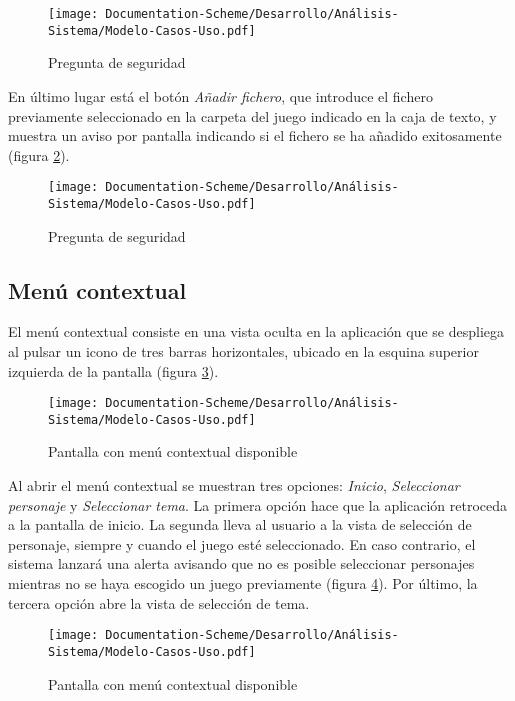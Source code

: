 \begin{figure}[H]
    \centering
    \texttt{[image: Documentation-Scheme/Desarrollo/Análisis-Sistema/Modelo-Casos-Uso.pdf]}
    \caption{Pregunta de seguridad}
    \label{SeleccionarFichero2}    
\end{figure}

En último lugar está el botón \textit{Añadir fichero}, que introduce el fichero previamente 
seleccionado en la carpeta del juego indicado en la caja de texto, y muestra un aviso por pantalla indicando si 
el fichero se ha añadido exitosamente (figura \ref*{AnadirFichero}). 

\begin{figure}[H]
    \centering
    \texttt{[image: Documentation-Scheme/Desarrollo/Análisis-Sistema/Modelo-Casos-Uso.pdf]}
    \caption{Pregunta de seguridad}
    \label{AnadirFichero}    
\end{figure}

\subsection{Menú contextual}
El menú contextual consiste en una vista oculta en la aplicación que se despliega al pulsar un icono de 
tres barras horizontales, ubicado en la esquina superior izquierda de la pantalla (figura \ref*{MenuContextualOculto}).

\begin{figure}[H]
    \centering
    \texttt{[image: Documentation-Scheme/Desarrollo/Análisis-Sistema/Modelo-Casos-Uso.pdf]}
    \caption{Pantalla con menú contextual disponible}
    \label{MenuContextualOculto}    
\end{figure}

Al abrir el menú contextual se muestran tres opciones: \textit{Inicio}, \textit{Seleccionar personaje} y 
\textit{Seleccionar tema}. La primera opción hace que la aplicación retroceda a la pantalla de inicio.
La segunda lleva al usuario a la vista de selección de personaje, siempre y cuando el juego esté seleccionado. 
En caso contrario, el sistema lanzará una alerta avisando que no es posible seleccionar personajes mientras no 
se haya escogido un juego previamente (figura \ref*{MenuContextual}). Por último, la tercera opción abre la vista de 
selección de tema.

\begin{figure}[H]
    \centering
    \texttt{[image: Documentation-Scheme/Desarrollo/Análisis-Sistema/Modelo-Casos-Uso.pdf]}
    \caption{Pantalla con menú contextual disponible}
    \label{MenuContextual}    
\end{figure}

